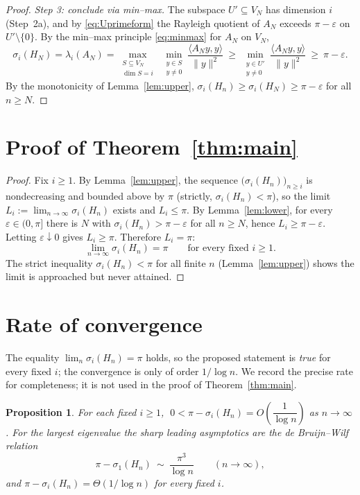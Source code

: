 \documentclass[12pt]{article}
\newtheorem{proposition}{Proposition}
\theoremstyle{remark}
\begin{document}
\begin{proof}
\smallskip
\noindent\emph{Step 3: conclude via min--max.} The subspace $U'\subseteq V_N$ has dimension $i$
(Step~2a), and by \eqref{eq:Uprimeform} the Rayleigh quotient of $A_N$ exceeds $\pi-\varepsilon$
on $U'\setminus\{0\}$. By the min--max principle \eqref{eq:minmax} for $A_N$ on $V_N$,
\[
\sigma_i(H_N)=\lambda_i(A_N)
=\max_{\substack{S\subseteq V_N\\\dim S=i}}\ \min_{\substack{y\in S\\ y\ne0}}
\frac{\langle A_Ny,y\rangle}{\|y\|^2}
\ \ge\ \min_{\substack{y\in U'\\ y\ne0}}\frac{\langle A_Ny,y\rangle}{\|y\|^2}\ \ge\ \pi-\varepsilon .
\]
By the monotonicity of Lemma~\ref{lem:upper}, $\sigma_i(H_n)\ge\sigma_i(H_N)\ge\pi-\varepsilon$
for all $n\ge N$.
\end{proof}

\section{Proof of Theorem~\ref{thm:main}}

\begin{proof}
Fix $i\ge1$. By Lemma~\ref{lem:upper}, the sequence $\bigl(\sigma_i(H_n)\bigr)_{n\ge i}$ is
nondecreasing and bounded above by $\pi$ (strictly, $\sigma_i(H_n)<\pi$), so the limit
$L_i:=\lim_{n\to\infty}\sigma_i(H_n)$ exists and $L_i\le\pi$. By Lemma~\ref{lem:lower}, for every
$\varepsilon\in(0,\pi]$ there is $N$ with $\sigma_i(H_n)>\pi-\varepsilon$ for all $n\ge N$, hence
$L_i\ge\pi-\varepsilon$. Letting $\varepsilon\downarrow0$ gives $L_i\ge\pi$. Therefore $L_i=\pi$:
\[
\lim_{n\to\infty}\sigma_i(H_n)=\pi\qquad\text{for every fixed }i\ge1 .
\]
The strict inequality $\sigma_i(H_n)<\pi$ for all finite $n$ (Lemma~\ref{lem:upper}) shows the
limit is approached but never attained.
\end{proof}

\section{Rate of convergence}

The equality $\lim_n\sigma_i(H_n)=\pi$ holds, so the proposed statement is \emph{true} for every
fixed $i$; the convergence is only of order $1/\log n$. We record the precise rate for
completeness; it is not used in the proof of Theorem~\ref{thm:main}.

\begin{proposition}\label{prop:rate}
For each fixed $i\ge1$, $\;0<\pi-\sigma_i(H_n)=O\!\left(\dfrac1{\log n}\right)$ as $n\to\infty$.
For the largest eigenvalue the sharp leading asymptotics are the de Bruijn--Wilf relation
\[
\pi-\sigma_1(H_n)\ \sim\ \frac{\pi^3}{\log n}\qquad(n\to\infty),
\]
and $\pi-\sigma_i(H_n)=\Theta(1/\log n)$ for every fixed $i$.
\end{proposition}
\end{document}
